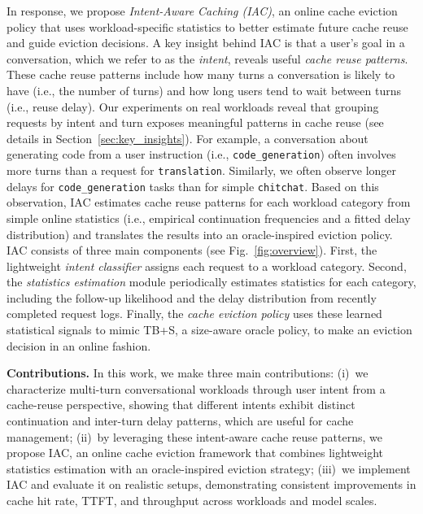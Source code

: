 \documentclass{article}
\newcommand{\jiny}[1]{\textcolor{orange}{[Jiny: #1]}}
\newcommand{\bo}[1]{\textcolor{red}{[Bo: #1]}}
\begin{document}
In response, we propose \emph{Intent-Aware Caching (IAC)}, an online cache eviction policy that uses workload-specific statistics to better estimate future cache reuse and guide eviction decisions. A key insight behind IAC is that a user's goal in a conversation, which we refer to as the \emph{intent}, reveals useful \emph{cache reuse patterns}. These cache reuse patterns include how many turns a conversation is likely to have (i.e., the number of turns) and how long users tend to wait between turns (i.e., reuse delay). Our experiments on real workloads reveal that grouping requests by intent and turn exposes meaningful patterns in cache reuse (see details in Section~\ref{sec:key_insights}). For example, a conversation about generating code from a user instruction (i.e., \texttt{code\_generation}) often involves more turns than a request for \texttt{translation}.
Similarly, we often observe longer delays for \texttt{code\_generation} tasks than for simple \texttt{chitchat}. Based on this observation,
IAC estimates cache reuse patterns for each workload category from simple online statistics (i.e., empirical continuation frequencies and a fitted delay distribution) and translates the results into an oracle-inspired eviction policy. IAC consists of three main components (see Fig.~\ref{fig:overview}). First, the lightweight \emph{intent classifier} assigns each request to a workload category. Second, the \emph{statistics estimation} module periodically estimates statistics for each category, including the follow-up likelihood and the delay distribution from recently completed request logs. Finally, the \emph{cache eviction policy} uses these learned statistical signals to mimic
TB+S, a size-aware oracle policy, to make an eviction decision in an online fashion.





\textbf{Contributions.} In this work, we make three main contributions: (i)~we characterize multi-turn conversational workloads through user intent from a cache-reuse perspective, showing that different intents exhibit distinct continuation and inter-turn delay patterns, which are useful for cache management; (ii)~by leveraging these intent-aware cache reuse patterns, we propose IAC, an online cache eviction framework that combines lightweight statistics estimation with an oracle-inspired eviction strategy; (iii)~we implement IAC and evaluate it on realistic setups, demonstrating consistent improvements in cache hit rate, TTFT, and throughput across workloads and model scales.
\end{document}
